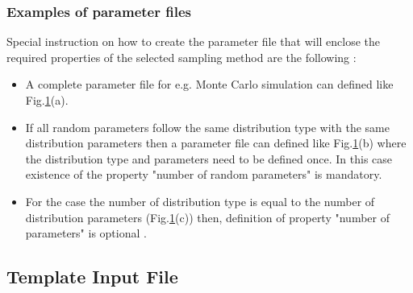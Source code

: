 \documentclass[preprint,12pt]{elsarticle}
\begin{document}
\subsubsection{Examples of parameter files}


\noindent
 Special instruction on how to create the parameter file that will enclose the required properties of the selected sampling method are the following :
 
 \begin{itemize}
 	 	\item  A complete parameter file for  e.g. Monte Carlo simulation can defined like Fig.\ref{template_mcs}(a).
 	
 	\item  If all random parameters follow the same distribution type with the same distribution parameters then a parameter file  can defined like Fig.\ref{template_mcs}(b) where the distribution type and parameters need to be defined once. In this case existence of the property  "number of random parameters" is mandatory.
 	
 	 \item  For the case the number of distribution type is equal to the number of distribution parameters (Fig.\ref{template_mcs}(c))  then, definition of property "number of parameters" is optional .
 	\end{itemize}


\begin{figure}[!ht]
	\caption{}
	\label{template_mcs}
\end{figure}



\subsection{Template Input File}
\end{document}
